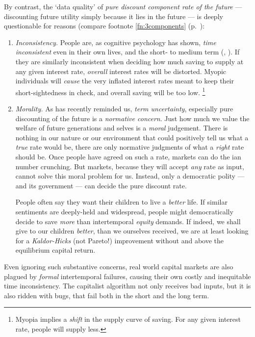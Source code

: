 By contrast, the `data quality' of \emph{pure discount component rate of the future} --- discounting future utility simply because it lies in the future --- is deeply questionable for reasons (compare footnote \ref{fn:3components} (p.~\pageref{fn:3components}):

\begin{enumerate}
	\item \emph{Inconsistency.}
	People are, as cognitive psychology has shown, \emph{time inconsistent} even in their own lives, and the short- to medium term (\citealt{Ainslie1975}, \citealt{Thaler1981}).
	If they are similarly inconsistent  when deciding how much saving to supply at any given interest rate, \emph{overall} interest rates will be distorted.
	Myopic individuals will \emph{cause} the very inflated interest rates meant to keep their short-sightedness in check, and overall saving will be too low.
	\footnote{
		Myopia implies a \emph{shift} in the supply curve of saving.
		For any given interest rate, people will supply less.
	}

	\item \emph{Morality.}
	As \cite[54]{Samuelson2005} has recently reminded us, \emph{term uncertainty}, especially pure discounting of the future is a \emph{normative concern}.
	Just how much we value the welfare of future generations and selves is a \emph{moral} judgement.
	There is nothing in our nature or our environment that could positively tell us what a \emph{true} rate would be, there are only normative judgments of what a \emph{right} rate should be.
	Once people have agreed on such a rate, markets can do the \citeauthor{Hayek1931}ian number crunching.
	But markets, because they will accept \emph{any} rate as input, cannot solve this moral problem for us.
	Instead, only a democratic polity --- and its government --- can decide the pure discount rate.

	People often say they want their children to live a \emph{better} life.
	If similar sentiments are deeply-held and widespread, people might democratically decide to save \emph{more} than intertemporal \emph{equity} demands.
	If indeed, we shall give to our children \emph{better}, than we ourselves received, we are at least looking for a \emph{Kaldor-Hicks} (not Pareto!) improvement without and above the equilibrium capital return.
\end{enumerate}

Even ignoring such substantive concerns, real world capital markets are also plagued by \emph{formal} intertemporal failures, causing their own costly and inequitable time inconsistency.
The capitalist algorithm not only receives bad inputs, but it is also ridden with bugs, that fail both in the short and the long term.

